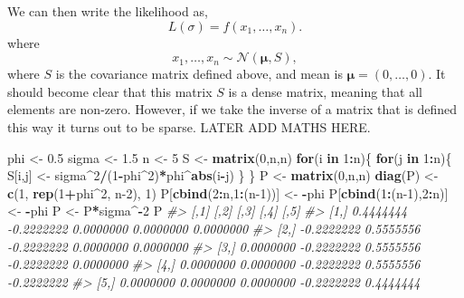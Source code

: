 \documentclass[
]{article}
\newenvironment{Shaded}{\begin{snugshade}}{\end{snugshade}}
\newcommand{\CommentTok}[1]{\textcolor[rgb]{0.56,0.35,0.01}{\textit{#1}}}
\newcommand{\ControlFlowTok}[1]{\textcolor[rgb]{0.13,0.29,0.53}{\textbf{#1}}}
\newcommand{\DecValTok}[1]{\textcolor[rgb]{0.00,0.00,0.81}{#1}}
\newcommand{\FloatTok}[1]{\textcolor[rgb]{0.00,0.00,0.81}{#1}}
\newcommand{\FunctionTok}[1]{\textcolor[rgb]{0.13,0.29,0.53}{\textbf{#1}}}
\newcommand{\NormalTok}[1]{#1}
\newcommand{\OtherTok}[1]{\textcolor[rgb]{0.56,0.35,0.01}{#1}}
\newcommand{\SpecialCharTok}[1]{\textcolor[rgb]{0.81,0.36,0.00}{\textbf{#1}}}
\begin{document}
We can then write the likelihood as, \[
  L(\sigma) = f(x_1, \ldots, x_n).
\] where \[
  x_1,\ldots,x_n \sim \mathcal{N}(\mathbf{\mu}, S),
\] where \(S\) is the covariance matrix defined above, and mean is
\(\mathbf{\mu} = (0, \ldots, 0)\). It should become clear that this
matrix \(S\) is a dense matrix, meaning that all elements are non-zero.
However, if we take the inverse of a matrix that is defined this way it
turns out to be sparse. LATER ADD MATHS HERE.

\begin{Shaded}
\begin{Highlighting}[]
\NormalTok{phi }\OtherTok{\textless{}{-}} \FloatTok{0.5}
\NormalTok{sigma }\OtherTok{\textless{}{-}} \FloatTok{1.5}
\NormalTok{n }\OtherTok{\textless{}{-}} \DecValTok{5}
\NormalTok{S }\OtherTok{\textless{}{-}} \FunctionTok{matrix}\NormalTok{(}\DecValTok{0}\NormalTok{,n,n)}
\ControlFlowTok{for}\NormalTok{(i }\ControlFlowTok{in} \DecValTok{1}\SpecialCharTok{:}\NormalTok{n)\{}
  \ControlFlowTok{for}\NormalTok{(j }\ControlFlowTok{in} \DecValTok{1}\SpecialCharTok{:}\NormalTok{n)\{}
\NormalTok{    S[i,j] }\OtherTok{\textless{}{-}}\NormalTok{ sigma}\SpecialCharTok{\^{}}\DecValTok{2}\SpecialCharTok{/}\NormalTok{(}\DecValTok{1}\SpecialCharTok{{-}}\NormalTok{phi}\SpecialCharTok{\^{}}\DecValTok{2}\NormalTok{)}\SpecialCharTok{*}\NormalTok{phi}\SpecialCharTok{\^{}}\FunctionTok{abs}\NormalTok{(i}\SpecialCharTok{{-}}\NormalTok{j)}
\NormalTok{  \}}
\NormalTok{\}}
\NormalTok{P }\OtherTok{\textless{}{-}} \FunctionTok{matrix}\NormalTok{(}\DecValTok{0}\NormalTok{,n,n)}
\FunctionTok{diag}\NormalTok{(P) }\OtherTok{\textless{}{-}} \FunctionTok{c}\NormalTok{(}\DecValTok{1}\NormalTok{, }\FunctionTok{rep}\NormalTok{(}\DecValTok{1}\SpecialCharTok{+}\NormalTok{phi}\SpecialCharTok{\^{}}\DecValTok{2}\NormalTok{, n}\DecValTok{{-}2}\NormalTok{), }\DecValTok{1}\NormalTok{)}
\NormalTok{P[}\FunctionTok{cbind}\NormalTok{(}\DecValTok{2}\SpecialCharTok{:}\NormalTok{n,}\DecValTok{1}\SpecialCharTok{:}\NormalTok{(n}\DecValTok{{-}1}\NormalTok{))] }\OtherTok{\textless{}{-}} \SpecialCharTok{{-}}\NormalTok{phi}
\NormalTok{P[}\FunctionTok{cbind}\NormalTok{(}\DecValTok{1}\SpecialCharTok{:}\NormalTok{(n}\DecValTok{{-}1}\NormalTok{),}\DecValTok{2}\SpecialCharTok{:}\NormalTok{n)] }\OtherTok{\textless{}{-}} \SpecialCharTok{{-}}\NormalTok{phi}
\NormalTok{P }\OtherTok{\textless{}{-}}\NormalTok{ P}\SpecialCharTok{*}\NormalTok{sigma}\SpecialCharTok{\^{}{-}}\DecValTok{2}
\NormalTok{P}
\CommentTok{\#\textgreater{}            [,1]       [,2]       [,3]       [,4]       [,5]}
\CommentTok{\#\textgreater{} [1,]  0.4444444 {-}0.2222222  0.0000000  0.0000000  0.0000000}
\CommentTok{\#\textgreater{} [2,] {-}0.2222222  0.5555556 {-}0.2222222  0.0000000  0.0000000}
\CommentTok{\#\textgreater{} [3,]  0.0000000 {-}0.2222222  0.5555556 {-}0.2222222  0.0000000}
\CommentTok{\#\textgreater{} [4,]  0.0000000  0.0000000 {-}0.2222222  0.5555556 {-}0.2222222}
\CommentTok{\#\textgreater{} [5,]  0.0000000  0.0000000  0.0000000 {-}0.2222222  0.4444444}


\end{Highlighting}
\end{Shaded}
\end{document}
